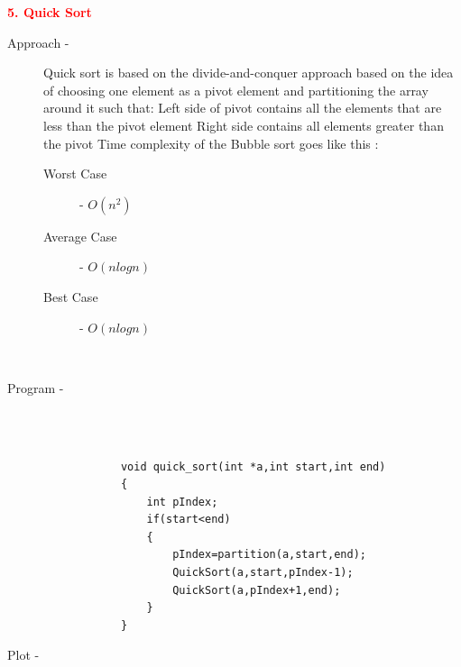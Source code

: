 \documentclass[0pt]{article}
\begin{document}
	
	
	
	
	
	
	
	
	
	
	
	
	
	
	
	
	
	
	
	
	
	\begin{flushleft}
		\textbf{\textcolor{red}{5. Quick Sort}}
		\leavevmode \\
		\begin{description}
			\item[Approach - ] Quick sort is based on the divide-and-conquer approach based on the idea of choosing one element as a pivot element and partitioning the array around it such that: Left side of pivot contains all the elements that are less than the pivot element Right side contains all elements greater than the pivot Time complexity of the Bubble sort goes like this :  
			\leavevmode \\
			\begin{description}
				\item[Worst Case] - \(O(n^2)\)
				\item[Average Case] - \(O(nlogn)\)
				\item[Best Case] - \(O(nlogn)\)
			\end{description}
			\leavevmode \\
			\item[Program - ] \leavevmode \\
			\leavevmode \\
			\begin{lstlisting}
			void quick_sort(int *a,int start,int end)
			{
				int pIndex;
				if(start<end)
				{
					pIndex=partition(a,start,end);
					QuickSort(a,start,pIndex-1);
					QuickSort(a,pIndex+1,end);
				}
			}
			\end{lstlisting}
			\item[Plot - ] \leavevmode \\
		\end{description}
	\end{flushleft}
	\begin{center}
	\end{center}
	\leavevmode \\
	
\end{document}
